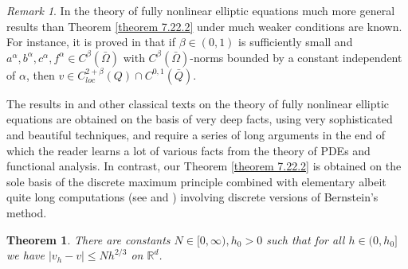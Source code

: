 \documentclass[11pt, reqno]{amsart}
\newtheorem{theorem}{Theorem}[section]
\theoremstyle{definition}
\theoremstyle{remark}
\newtheorem{remark}{Remark}[section]
\begin{document}
\begin{remark}
                                          \label{remark 6.26.1}
In the theory of fully nonlinear elliptic equations
much more general results than Theorem \ref{theorem 7.22.2}
 under much weaker
conditions are known. For instance, it is proved in \cite{Sa}
that if $\beta\in(0,1)$ is sufficiently small
and $a^{\alpha},b^{\alpha},c^{\alpha},f^{\alpha}\in C^{\beta}(\bar{\Omega})$
with $C^{\beta}(\bar{\Omega})$-norms bounded by a constant
independent of $\alpha$, then $v\in C^{2+\beta}_{loc}(Q)\cap C^{0,1}(\bar{Q})$.

The results in \cite{Sa} and other classical texts on
the theory of fully nonlinear elliptic equations are obtained
on the basis of very deep facts, using very sophisticated 
and beautiful techniques,
and require a series of long arguments in the end of which
the reader learns a lot of various facts from the theory
of PDEs and functional analysis.
In contrast, our Theorem \ref{theorem 7.22.2} is obtained
on the sole basis of the discrete maximum principle
combined with elementary albeit  quite long computations
(see \cite{Kr12.1} and \cite{Kr12.2}) involving
discrete versions of Bernstein's method.

\end{remark}

\begin{theorem}
                                        \label{theorem 7.22.3}
There are  constants $N\in[0,\infty),h_{0}>0$ such that
for all  $h\in(0,h_{0}]$ we have $|v_{h}-v|\leq Nh^{2/3}$
on ${\mathbb{R}}^{d}$. 
\end{theorem}
\end{document}
